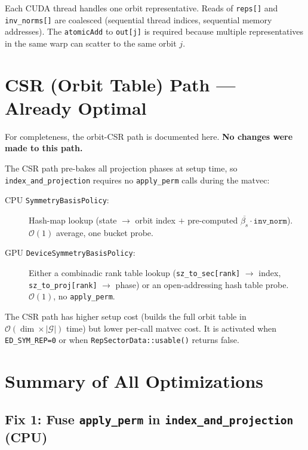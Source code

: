 \documentclass[11pt,a4paper]{article}
\begin{document}
Each CUDA thread handles one orbit representative.  Reads of \texttt{reps[]}
and \texttt{inv\_norms[]} are coalesced (sequential thread indices, sequential
memory addresses).  The \texttt{atomicAdd} to \texttt{out[j]} is required
because multiple representatives in the same warp can scatter to the same orbit
$j$.

\section{CSR (Orbit Table) Path --- Already Optimal}
\label{sec:csr}

For completeness, the orbit-CSR path is documented here.  \textbf{No changes
were made to this path.}

The CSR path pre-bakes all projection phases at setup time, so
\texttt{index\_and\_projection} requires no \texttt{apply\_perm} calls during
the matvec:

\begin{description}
  \item[CPU \texttt{SymmetryBasisPolicy}:] Hash-map lookup
    (state $\to$ orbit index $+$ pre-computed $\overline{\beta_s} \cdot
    \texttt{inv\_norm}$).  $\mathcal{O}(1)$ average, one bucket probe.

  \item[GPU \texttt{DeviceSymmetryBasisPolicy}:] Either a combinadic rank
    table lookup (\texttt{sz\_to\_sec[rank]} $\to$ index,
    \texttt{sz\_to\_proj[rank]} $\to$ phase) or an open-addressing hash table
    probe.  $\mathcal{O}(1)$, no \texttt{apply\_perm}.
\end{description}

The CSR path has higher setup cost (builds the full orbit table in
$\mathcal{O}(\dim \times |\mathcal{G}|)$ time) but lower per-call matvec cost.
It is activated when \texttt{ED\_SYM\_REP=0} or when
\texttt{RepSectorData::usable()} returns false.

\section{Summary of All Optimizations}
\label{sec:summary}

\subsection{Fix 1: Fuse \texttt{apply\_perm} in \texttt{index\_and\_projection} (CPU)}
\end{document}
